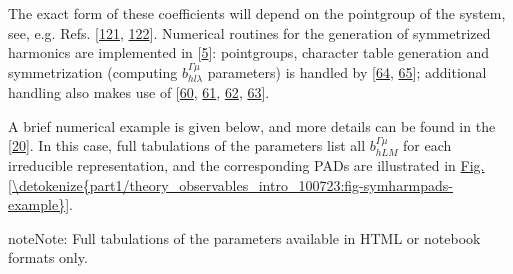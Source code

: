 \documentclass[letterpaper,table,10pt,english]{jupyterBook}
\begin{document}
\sphinxAtStartPar
The exact form of these coefficients will depend on the point\sphinxhyphen{}group of the system, see, e.g. Refs. {[}\hyperlink{cite.backmatter/bibliography:id555}{121}, \hyperlink{cite.backmatter/bibliography:id839}{122}{]}. Numerical routines for the generation of symmetrized harmonics are implemented in  {[}\hyperlink{cite.backmatter/bibliography:id682}{5}{]}: point\sphinxhyphen{}groups, character table generation and symmetrization (computing \(b_{hl\lambda}^{\Gamma\mu}\) parameters) is handled by  {[}\hyperlink{cite.backmatter/bibliography:id708}{64}, \hyperlink{cite.backmatter/bibliography:id709}{65}{]}; additional handling also makes use of  {[}\hyperlink{cite.backmatter/bibliography:id888}{60}, \hyperlink{cite.backmatter/bibliography:id957}{61}, \hyperlink{cite.backmatter/bibliography:id958}{62}, \hyperlink{cite.backmatter/bibliography:id959}{63}{]}.

\sphinxAtStartPar
A brief numerical example is given below, and more details can be found in the  {[}\hyperlink{cite.backmatter/bibliography:id681}{20}{]}. In this case, full tabulations of the parameters list all \(b_{hLM}^{\Gamma\mu}\) for each irreducible representation, and the corresponding PADs are illustrated in \hyperref[\detokenize{part1/theory_observables_intro_100723:fig-symharmpads-example}]{Fig.\@ \ref{\detokenize{part1/theory_observables_intro_100723:fig-symharmpads-example}}}.

\begin{sphinxShadowBox}
\sphinxstylesidebartitle{}

\begin{sphinxadmonition}{note}{Note:}
\sphinxAtStartPar
Full tabulations of the parameters available in HTML or notebook formats only.
\end{sphinxadmonition}
\end{sphinxShadowBox}
\end{document}

